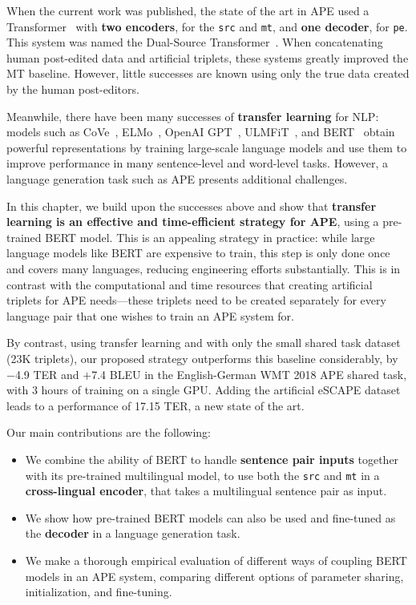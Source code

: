 When the current work was published, the state of the art in APE used
a Transformer~\citep{vaswani2017attention} with {\bf two encoders},
for the {\tt src} and {\tt mt}, and {\bf one decoder}, for {\tt pe}.
This system was named the Dual-Source
Transformer~\citep{junczys2018ms, tebbifakhr2018multi}. When
concatenating human post-edited data and artificial triplets, these
systems greatly improved the MT baseline. However, little successes
are known using only the true data created by the human post-editors.

Meanwhile, there have been many successes of {\bf transfer learning}
for NLP: models such as CoVe~\citep{mccann2017learned},
ELMo~\citep{peters2018deep}, OpenAI GPT~\citep{radford2018improving},
ULMFiT~\citep{howard2018universal}, and BERT~\citep{devlin2018bert}
obtain powerful representations by training large-scale language
models and use them to improve performance in many sentence-level and
word-level tasks. However, a language generation task such as APE
presents additional challenges.

In this chapter, we build upon the successes above and show that {\bf
    transfer learning is an effective and time-efficient strategy for
    APE}, using a pre-trained BERT model. This is an appealing strategy
in practice: while large language models like BERT are expensive to
train, this step is only done once and covers many languages,
reducing engineering efforts substantially. This is in contrast with
the computational and time resources that creating artificial
triplets for APE needs---these triplets need to be created separately
for every language pair that one wishes to train an APE system for.

By contrast, using transfer learning and with only the small shared
task dataset (23K triplets), our proposed strategy outperforms this
baseline considerably, by $-$4.9 TER and $+$7.4 BLEU in the
English-German WMT 2018 APE shared task, with 3 hours of training on
a single GPU. Adding the artificial eSCAPE
dataset~\citep{negri2018escape} leads to a performance of 17.15 TER,
a new state of the art.

Our main contributions are the following:
\begin{itemize}
  \item We combine the ability of BERT to
        handle {\bf sentence pair inputs} together with its pre-trained
        multilingual model, to use both the {\tt src} and {\tt mt} in a
          {\bf cross-lingual encoder}, that takes a multilingual
        sentence pair as input.
  \item We show how pre-trained BERT models can also be used and
        fine-tuned as the {\bf decoder} in a language generation task.
  \item We make a thorough empirical evaluation of different ways of
        coupling BERT models in an APE system, comparing different options
        of parameter sharing, initialization, and fine-tuning.
\end{itemize}

